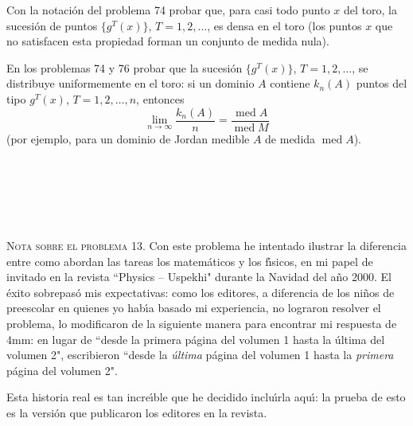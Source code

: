 \documentclass[12pt]{article}  %
\begin{document}
\bigskip
{} Con la notaci\'on del problema 74 probar que, para casi todo punto $x$ del toro,
la sucesi\'on de puntos $\{g^T (x)\}$, $T=1, 2, \dots$, es densa en el toro
(los puntos $x$ que no satisfacen esta propiedad forman un conjunto de medida nula).

\bigskip
{} En los problemas 74 y 76 probar que la sucesi\'on $\{g^T (x)\}$, $T=1, 2, \dots$, se distribuye uniformemente en el toro: 
si un dominio $A$ contiene $k_n(A)$ puntos del tipo $ g^T (x) $,  $T=1, 2, \dots,n$, entonces
$$
\lim_{n \to \infty} \frac{k_n(A)}{n}=\frac{\operatorname{med} A}{\operatorname{med} M}
$$
(por ejemplo, para un dominio de Jordan medible $A$ de medida $\operatorname{med} A$).

\ 

\ 

\ 

\textsc{Nota sobre el problema 13.} Con este problema he intentado ilustrar la diferencia entre como abordan las tareas los matem\'aticos y los f\'{\i}sicos, en mi papel de invitado en la revista ``Physics -- Uspekhi"  durante la Navidad del a\~no 2000. El \'exito sobrepas\'o mis expectativas: como los editores, a diferencia de los ni\~nos de preescolar en quienes yo hab\'{\i}a basado mi experiencia, no lograron resolver el problema, lo modificaron de la siguiente manera para encontrar mi respuesta de 4mm: en lugar de ``desde la primera p\'agina del volumen 1 hasta la \'ultima del volumen 2",  escribieron ``desde la {\em \'ultima\/} p\'agina del volumen 1 hasta la {\em primera\/} p\'agina del volumen 2".

Esta historia real es tan incre\'{\i}ble que he decidido inclu\'{\i}rla aqu\'{\i}: la prueba de esto es la versi\'on que publicaron los editores en la revista.  

\clearpage
\end{document}
